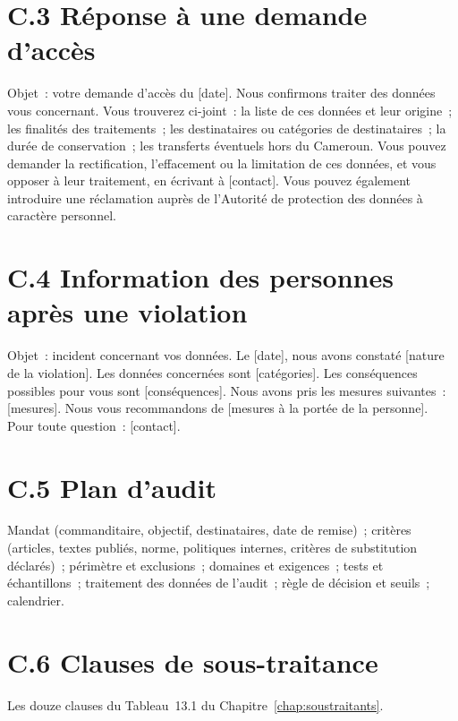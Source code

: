 \section*{C.3 Réponse à une demande d'accès}

Objet~: votre demande d'accès du [date]. Nous confirmons traiter des données
vous concernant. Vous trouverez ci-joint~: la liste de ces données et leur
origine~; les finalités des traitements~; les destinataires ou catégories
de destinataires~; la durée de conservation~; les transferts éventuels hors
du Cameroun. Vous pouvez demander la rectification, l'effacement ou la
limitation de ces données, et vous opposer à leur traitement, en écrivant à
[contact]. Vous pouvez également introduire une réclamation auprès de
l'Autorité de protection des données à caractère personnel.

\section*{C.4 Information des personnes après une violation}

Objet~: incident concernant vos données. Le [date], nous avons constaté
[nature de la violation]. Les données concernées sont [catégories]. Les
conséquences possibles pour vous sont [conséquences]. Nous avons pris les
mesures suivantes~: [mesures]. Nous vous recommandons de [mesures à la
portée de la personne]. Pour toute question~: [contact].

\section*{C.5 Plan d'audit}

Mandat (commanditaire, objectif, destinataires, date de remise)~;
critères (articles, textes publiés, norme, politiques internes, critères
de substitution déclarés)~; périmètre et exclusions~; domaines et
exigences~; tests et échantillons~; traitement des données de l'audit~;
règle de décision et seuils~; calendrier.

\section*{C.6 Clauses de sous-traitance}

Les douze clauses du Tableau~13.1 du Chapitre~\ref{chap:soustraitants}.
